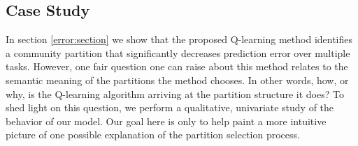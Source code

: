 \subsection{Case Study}
In section \ref{error:section} we show that the proposed Q-learning method identifies a community partition that significantly decreases prediction error over multiple tasks. However, one fair question one can raise about this method relates to the semantic meaning of the partitions the method chooses. In other words, how, or why, is the Q-learning algorithm arriving at the partition structure it does? To shed light on this question, we perform a qualitative, univariate study of the behavior of our model. Our goal here is only to help paint a more intuitive picture of one possible explanation of the partition selection process.
\begin{figure}
\centering
{}

\end{figure}
